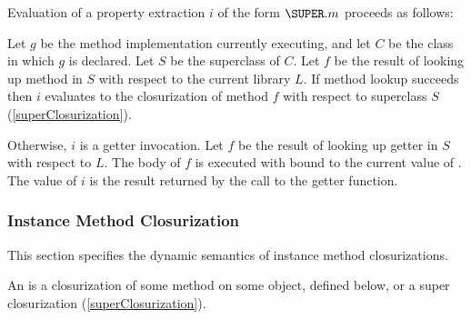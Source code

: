 \documentclass[makeidx]{article}
\begin{document}
{

\LMHash{}%
Evaluation of a property extraction $i$ of the form $\SUPER.m$
proceeds as follows:

\LMHash{}%
Let $g$ be the method implementation currently executing,
and let $C$ be the class in which $g$ is declared.
Let $S$ be the superclass of $C$.
Let $f$ be the result of looking up method \id{} in $S$
with respect to the current library $L$.
If method lookup succeeds then $i$ evaluates to
the closurization of method $f$
with respect to superclass $S$
(\ref{superClosurization}).

\LMHash{}%
Otherwise, $i$ is a getter invocation.
Let $f$ be the result of looking up
getter \id{} in $S$ with respect to $L$.
The body of $f$ is executed with \THIS{} bound to the current value of \THIS.
The value of $i$ is the result returned by the call to the getter function.



\subsubsection{Instance Method Closurization}

\LMHash{}%
This section specifies the dynamic semantics of instance method closurizations.


\LMHash{}%
An 
is a closurization of some method on some object, defined below,
or a super closurization (\ref{superClosurization}).

}
\end{document}
